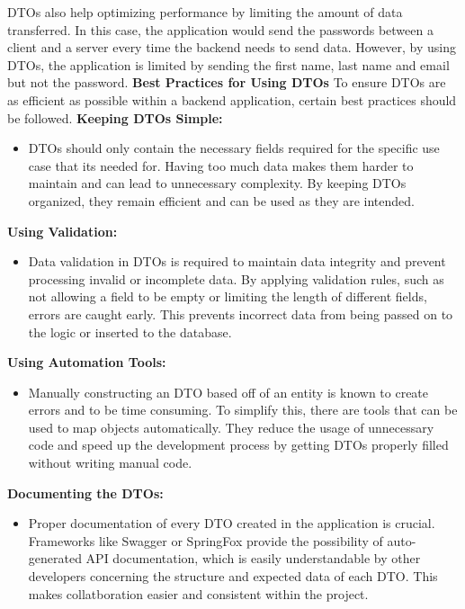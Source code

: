     DTOs also help optimizing performance by limiting the amount of data transferred. In this case, the application would send the passwords between a client and a server every time the backend needs to send data. However, by using DTOs, the application is limited by sending the first name, last name and email but not the password. \newline 
    \textbf{Best Practices for Using DTOs} \newline
    To ensure DTOs are as efficient as possible within a backend application, certain best practices should be followed. \newline 
    \textbf{Keeping DTOs Simple:}
        \begin{itemize}
            \item DTOs should only contain the necessary fields required for the specific use case that its needed for. Having too much data makes them harder to maintain and can lead to unnecessary complexity. By keeping DTOs organized, they remain efficient and can be used as they are intended.
        \end{itemize}
    \textbf{Using Validation:}
        \begin{itemize}
            \item Data validation in DTOs is required to maintain data integrity and prevent processing invalid or incomplete data. By applying validation rules, such as not allowing a field to be empty or limiting the length of different fields, errors are caught early. This prevents incorrect data from being passed on to the logic or inserted to the database.
        \end{itemize}
    \textbf{Using Automation Tools:}
        \begin{itemize}
            \item Manually constructing an DTO based off of an entity is known to create errors and to be time consuming. To simplify this, there are tools that can be used to map objects automatically. They reduce the usage of unnecessary code and speed up the development process by getting DTOs properly filled without writing manual code.
        \end{itemize}
    \textbf{Documenting the DTOs:}
        \begin{itemize}
            \item Proper documentation of every DTO created in the application is crucial. Frameworks like Swagger or SpringFox provide the possibility of auto-generated API documentation, which is easily understandable by other developers concerning the structure and expected data of each DTO. This makes collatboration easier and consistent within the project. \newline
        \end{itemize} 
